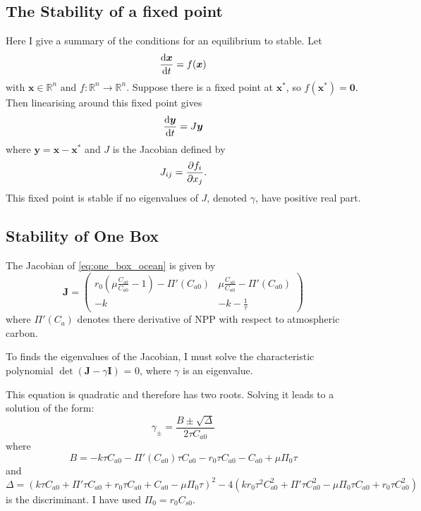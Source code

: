 \subsection{The Stability of a fixed point}
Here I give a summary of the conditions for an equilibrium to stable. Let
\begin{equation}
  \label{eq:generic_system}
  \dv{\bm{x}}{t} = f(\bm{x})
\end{equation}
with $\bm{x} \in \mathbb{R}^n$ and $f: \mathbb{R}^n \rightarrow \mathbb{R}^n$. Suppose there is a fixed point at $\bm{x}^*$, so $f(\bm{x}^*) = \bm{0}$. Then linearising around this
fixed point gives
\begin{equation}
  \label{eq:generic_system_linearised}
  \dv{\bm{y}}{t} = J\bm{y}
\end{equation}
where $\bm{y} = \bm{x} - \bm{x}^*$ and $J$ is the Jacobian defined by
\begin{equation}
  \label{eq:generic_jacobian}
  J_{ij} = \pdv{f_i}{x_j}.
\end{equation}
This fixed point is stable if no eigenvalues of $J$, denoted $\gamma$, have positive real part.
\subsection{Stability of One Box}
The Jacobian of \cref{eq:one_box_ocean} is given by
\begin{equation}
  \label{eq:jacobian_of_one_box}
    \bm{J} = 
    \begin{pmatrix}
    r_0 \left( \mu \frac{C_{s0}}{C_{a0}} - 1\right) - \Pi'(C_{a0}) & 
    \mu \frac{C_{s0}}{C_{a0}} - \Pi'(C_{a0}) \\
    -k & -k - \frac{1}{\tau}
    \end{pmatrix}
  \end{equation}
where $\Pi'(C_a)$ denotes there derivative of NPP with respect to atmospheric carbon.
  
To finds the eigenvalues of the Jacobian, I must solve the characteristic polynomial $\det(\bm{J} - \gamma \bm{I})$ = 0, where $\gamma$ is an eigenvalue.

This equation is quadratic and therefore has two roots. Solving it leads to a solution of the form:
\begin{equation}
  \label{eq:eigenvalues_of_one_box_jac}
  \gamma_{\pm} = \frac{B \pm \sqrt{\Delta}}{2\tau C_{a0}}
\end{equation}
where
\begin{equation}
  \label{eq:B_in_one_box}
  B = -k \tau  C_{a0}-\Pi'(C_{a0}) \tau  C_{a0}-r_0 \tau  C_{a0}-C_{a0}+\mu  \Pi_0 \tau
\end{equation}
and
\begin{equation}
  \label{eq:discriminant_from_one_box}
  \Delta = \left(k \tau  C_{a0} +\Pi'\tau  C_{a0}+r_0 \tau  C_{a0}+C_{a0}-\mu  \Pi_0 \tau \right)^2-4 \left(k r_0 \tau ^2 C_{a0}^2+\Pi' \tau  C_{a0}^2-\mu  \Pi_0 \tau  C_{a0} +r_0 \tau  C_{a0}^2\right)
\end{equation}
is the discriminant. I have used $\Pi_0 = r_0 C_{s0}$.

